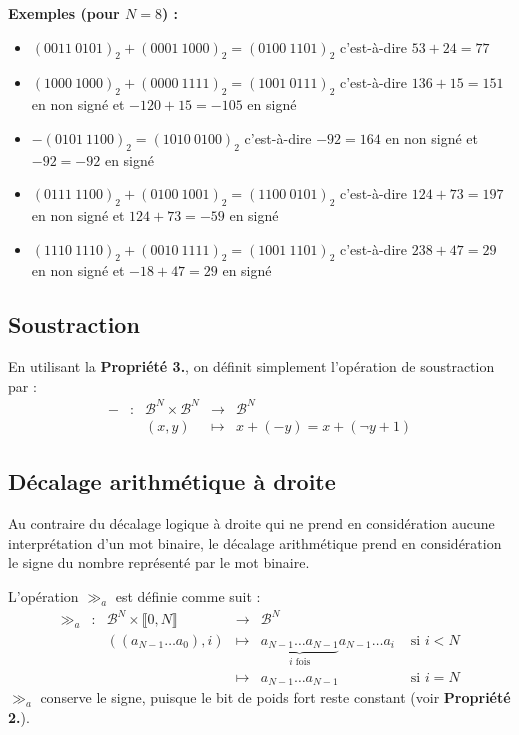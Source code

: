 \documentclass[../../main.tex]{subfiles}
\begin{document}
\textbf{Exemples (pour $N = 8$) :}
\begin{itemize}
  \item $(0011\ 0101)_{2} + (0001\ 1000)_{2} = (0100\ 1101)_{2}$\newline
    c'est-à-dire $53 + 24 = 77$
  \item $(1000\ 1000)_{2} + (0000\ 1111)_{2} = (1001\ 0111)_{2}$\newline
    c'est-à-dire $136 + 15 = 151$ en non signé et $-120 + 15 = -105$ en signé
  \item $-(0101\ 1100)_{2} = (1010\ 0100)_{2}$\newline
    c'est-à-dire $-92 = 164$ en non signé et $-92 = -92$ en signé
  \item $(0111\ 1100)_{2} + (0100\ 1001)_{2} = (1100\ 0101)_{2}$\newline
    c'est-à-dire $124 + 73 = 197$ en non signé et $124 + 73 = -59$ en signé
  \item $(1110\ 1110)_{2} + (0010\ 1111)_{2} = (1001\ 1101)_{2}$\newline
    c'est-à-dire $238 + 47 = 29$ en non signé et $-18 + 47 = 29$ en signé
\end{itemize}
\subsection{Soustraction} \label{sub:soustraction}
En utilisant la \textbf{Propriété 3.}, on définit simplement l'opération de soustraction par :
$$
\begin{array}{lclcl}
- & : & \mathcal{B}^{N}\times{\mathcal{B}^{N}} & \rightarrow & \mathcal{B}^{N} \\
     &   & (x, y) & \mapsto & x + (-y) = x + (\neg{y} + 1)
\end{array}
$$
\subsection{Décalage arithmétique à droite} \label{sub:d_calage_arithm_tique_droite}
Au contraire du décalage logique à droite qui ne prend en considération aucune interprétation d'un mot binaire, le décalage arithmétique prend en considération le signe du nombre représenté par le mot binaire.

L'opération $\gg_{a}$ est définie comme suit :
$$
\begin{array}{lclcll}
\gg_{a} & : & \mathcal{B}^{N}\times{\llbracket0, N\rrbracket} & \rightarrow & \mathcal{B}^{N} \\
     &   & ((a_{N-1}\dots a_{0}), i) & \mapsto & \underbrace{a_{N-1}\dots a_{N-1}}_{\text{$i$ fois}}a_{N-1}\dots a_{i} & \text{ si $i < N$} \\
     &   & & \mapsto & a_{N-1}\dots a_{N-1} & \text{ si $i = N$}
\end{array}
$$
$\gg_{a}$ conserve le signe, puisque le bit de poids fort reste constant (voir \textbf{Propriété 2.}).
\end{document}
